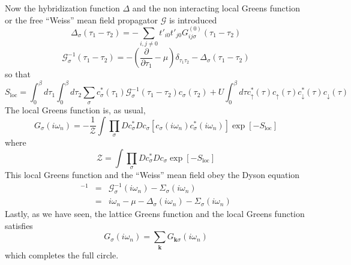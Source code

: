 \documentclass[a4paper]{article}
\begin{document}
Now the hybridization function $\Delta$ and the non interacting local Greens
function or the free ``Weiss'' mean field propagator $\mathcal{G}$ is introduced
\begin{equation}
    \Delta_{\sigma} (\tau_1 - \tau_2) =
        - \sum_{i,j\neq0} t'_{i0} t'_{j0} G_{ij\sigma}^{(0)} (\tau_1 - \tau_2)
\end{equation}
\begin{equation}
    \mathcal{G}_{\sigma}^{-1} (\tau_1 - \tau_2) =
        -\left(\frac{\partial}{\partial\tau_1} - \mu\right)\delta_{\tau_1\tau_2}
        -\Delta_{\sigma}(\tau_1 - \tau_2)
\end{equation}
so that
\begin{equation}
    S_{\text{loc}} =
        \int_{0}^{\beta} d\tau_1 \int_{0}^{\beta} d\tau_2 \sum_{\sigma}
            c^{*}_{\sigma}(\tau_1)
            \mathcal{G}_{\sigma}^{-1} (\tau_1 - \tau_2)
            c_{\sigma}(\tau_2)
       +U \int_{0}^{\beta} d\tau
            c^{*}_{\uparrow}(\tau)c_{\uparrow}(\tau)
            c^{*}_{\downarrow}(\tau)c_{\downarrow}(\tau)
\end{equation}
The local Greens function is, as usual,
\begin{equation}
    G_{\sigma}(i\omega_n) =
        -\frac{1}{\mathcal{Z}}
        \int\prod_{\sigma} Dc_{\sigma}^{*}Dc_{\sigma}
            [c_{\sigma}(i\omega_n)c_{\sigma}^{*}(i\omega_n)] 
            \exp[ -S_\text{loc} ]
\end{equation}
where
\begin{equation}
    \mathcal{Z} = 
        \int\prod_{\sigma} Dc_{\sigma}^{*}Dc_{\sigma} \exp[-S_\text{loc}]
\end{equation}
This local Greens function and the ``Weiss'' mean field obey the Dyson equation
\begin{eqnarray}
    [G_{\sigma}(i\omega_n)]^{-1}
        &=& \mathcal{G}_{\sigma}^{-1}(i\omega_n) -\Sigma_\sigma(i\omega_n) \\
        &=& i\omega_n -\mu -\Delta_\sigma(i\omega_n) -\Sigma_\sigma(i\omega_n)
\end{eqnarray}
Lastly, as we have seen, the lattice Greens function and the local Greens
function satisfies
\begin{equation}
    G_{\sigma}(i\omega_n) = \sum_{\mathbf{k}} G_{\mathbf{k}\sigma}(i\omega_n)
\end{equation}
which completes the full circle.


\end{document}
